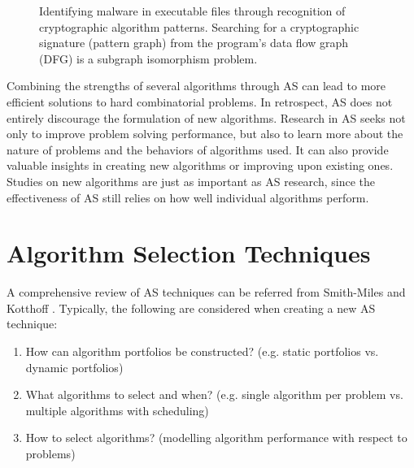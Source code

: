 \begin{figure}[H]
	\centering
	\caption[Identifying malware in executable files through recognition of cryptographic algorithm patterns]{Identifying malware in executable files through recognition of cryptographic algorithm patterns. Searching for a cryptographic signature (pattern graph) from the program's data flow graph (DFG) is a subgraph isomorphism problem. \citep{lestringant2015automated}}
	\label{fig:flowchart}
\end{figure}

Combining the strengths of several algorithms through AS can lead to more efficient solutions to hard combinatorial problems. In retrospect, AS does not entirely discourage the formulation of new algorithms. Research in AS seeks not only to improve problem solving performance, but also to learn more about the nature of problems and the behaviors of algorithms used. It can also provide valuable insights in creating new algorithms or improving upon existing ones. Studies on new algorithms are just as important as AS research, since the effectiveness of AS still relies on how well individual algorithms perform.

\section{Algorithm Selection Techniques}
A comprehensive review of AS techniques can be referred from Smith-Miles \citep{smith2009cross} and Kotthoff \citep{kotthoff2016algorithm}. Typically, the following are considered when creating a new AS technique:

\begin{enumerate}
	\item How can algorithm portfolios be constructed? (e.g. static portfolios vs. dynamic portfolios)
	\item What algorithms to select and when? (e.g. single algorithm per problem vs. multiple algorithms with scheduling)
	\item How to select algorithms? (modelling algorithm performance with respect to problems)
\end{enumerate}

